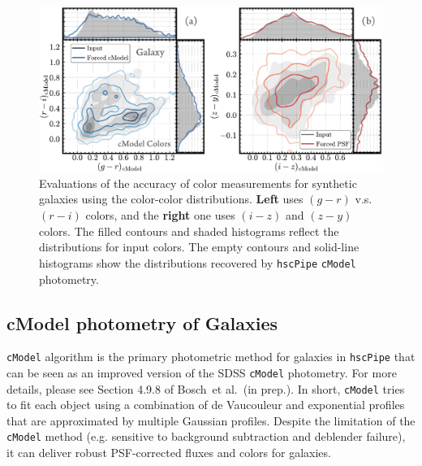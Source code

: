 \documentclass[useamsfonts]{pasj01}
\def\etal{{\ et al.~}}
\def\hscpipe{\texttt{hscPipe}}
\def\cmodel{\texttt{cModel}}
\begin{document}
\begin{figure}
    \begin{center}
        \includegraphics[width=\textwidth]{fig/synpipe_galaxy_cdist}
    \end{center}
    \caption{
        Evaluations of the accuracy of color measurements for synthetic galaxies
        using the color-color distributions.
        \textbf{Left} uses $(g-r)$ v.s. $(r-i)$ colors, and the \textbf{right} one
        uses $(i-z)$ and $(z-y)$ colors.
        The filled contours and shaded histograms reflect the distributions for input
        colors.
        The empty contours and solid-line histograms show the distributions recovered
        by \hscpipe{} \cmodel{} photometry.
        }
    \label{fig:cmodel_cdist}
\end{figure}

\subsection{cModel photometry of Galaxies}
    \label{ssec:cmodel}

    \cmodel{} algorithm is the primary photometric method for galaxies in
    \hscpipe{} that can be seen as an improved version of the SDSS \cmodel{}
    photometry.
    For more details, please see Section 4.9.8 of Bosch\etal (in prep.).
    In short, \cmodel{} tries to fit each object using a combination of de Vaucouleur
    and exponential profiles that are approximated by multiple Gaussian profiles.
    Despite the limitation of the \cmodel{} method (e.g. sensitive to background
    subtraction and deblender failure), it can deliver robust PSF-corrected fluxes and
    colors for galaxies.
\end{document}
